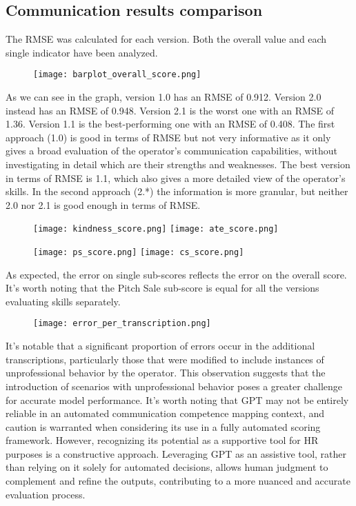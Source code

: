 \subsection{Communication results comparison}
The RMSE was calculated for each version. Both the overall value and each single indicator have been analyzed.
\begin{center}
      \begin{figure}[ht]
            \texttt{[image: barplot\_overall\_score.png]}
      \end{figure}
\end{center}
As we can see in the graph, version 1.0 has an RMSE of 0.912. Version 2.0 instead has an RMSE of 0.948. Version 2.1 is the worst one with an RMSE of 1.36. Version 1.1 is the best-performing one with an RMSE of 0.408.
The first approach (1.0) is good in terms of RMSE but not very informative as it only gives a broad evaluation of the operator's communication capabilities, without investigating in detail which are their strengths and weaknesses. The best version in terms of RMSE is 1.1, which also gives a more detailed view of the operator's skills. In the second approach (2.*) the information is more granular, but neither 2.0 nor 2.1 is good enough in terms of RMSE.
\begin{center}
      \begin{figure}
            \texttt{[image: kindness\_score.png]}
            \texttt{[image: ate\_score.png]}
      \end{figure}
      \begin{figure}
            \texttt{[image: ps\_score.png]}
            \texttt{[image: cs\_score.png]}
      \end{figure}
\end{center}
As expected, the error on single sub-scores reflects the error on the overall score. It's worth noting that the Pitch Sale sub-score is equal for all the versions evaluating skills separately.
\begin{center}
      \begin{figure}[ht]
            \texttt{[image: error\_per\_transcription.png]}
      \end{figure}
\end{center}

It's notable that a significant proportion of errors occur in the additional transcriptions, particularly those that were modified to include instances of unprofessional behavior by the operator. This observation suggests that the introduction of scenarios with unprofessional behavior poses a greater challenge for accurate model performance. It's worth noting that GPT may not be entirely reliable in an automated communication competence mapping context, and caution is warranted when considering its use in a fully automated scoring framework. However, recognizing its potential as a supportive tool for HR purposes is a constructive approach. Leveraging GPT as an assistive tool, rather than relying on it solely for automated decisions, allows human judgment to complement and refine the outputs, contributing to a more nuanced and accurate evaluation process.

